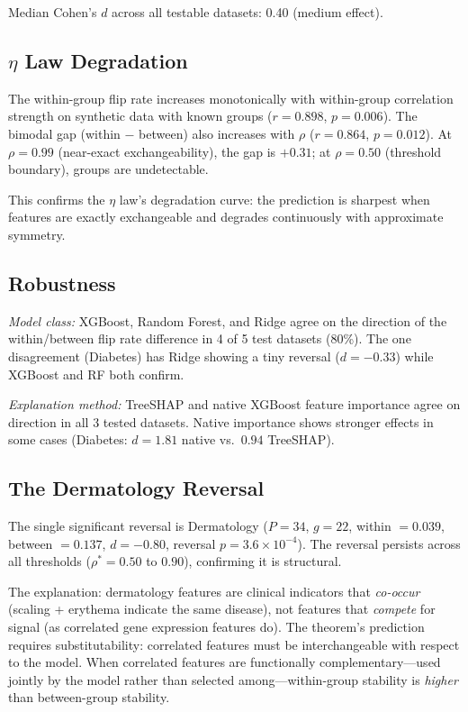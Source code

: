 \documentclass[11pt]{article}
\begin{document}
Median Cohen's $d$ across all testable datasets: 0.40 (medium effect).

\subsection{$\eta$ Law Degradation}

The within-group flip rate increases monotonically with within-group
correlation strength on synthetic data with known groups ($r = 0.898$,
$p = 0.006$).  The bimodal gap (within $-$ between) also increases with
$\rho$ ($r = 0.864$, $p = 0.012$).  At $\rho = 0.99$ (near-exact
exchangeability), the gap is $+0.31$; at $\rho = 0.50$ (threshold
boundary), groups are undetectable.

This confirms the $\eta$ law's degradation curve: the prediction is
sharpest when features are exactly exchangeable and degrades continuously
with approximate symmetry.

\subsection{Robustness}

\emph{Model class:} XGBoost, Random Forest, and Ridge agree on the
direction of the within/between flip rate difference in 4 of 5 test
datasets (80\%).  The one disagreement (Diabetes) has Ridge showing a tiny
reversal ($d = -0.33$) while XGBoost and RF both confirm.

\emph{Explanation method:} TreeSHAP and native XGBoost feature importance
agree on direction in all 3 tested datasets.  Native importance shows
stronger effects in some cases (Diabetes: $d = 1.81$ native vs.\ $0.94$
TreeSHAP).

\subsection{The Dermatology Reversal}
\label{sec:reversal}

The single significant reversal is Dermatology ($P = 34$, $g = 22$,
within $= 0.039$, between $= 0.137$, $d = -0.80$, reversal
$p = 3.6 \times 10^{-4}$).  The reversal persists across all thresholds
($\rho^* = 0.50$ to $0.90$), confirming it is structural.

The explanation: dermatology features are clinical indicators that
\emph{co-occur} (scaling + erythema indicate the same disease), not
features that \emph{compete} for signal (as correlated gene expression
features do).  The theorem's prediction requires substitutability:
correlated features must be interchangeable with respect to the model.
When correlated features are functionally complementary---used jointly by
the model rather than selected among---within-group stability is
\emph{higher} than between-group stability.
\end{document}
